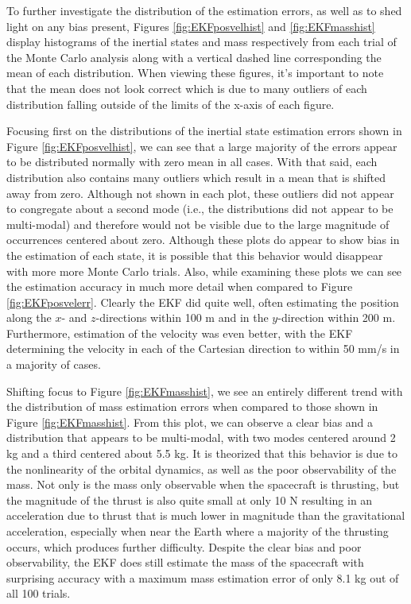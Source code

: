 \documentclass[letterpaper, paper,11pt]{AAS}		%
\begin{document}
To further investigate the distribution of the estimation errors, as well as to shed light on any bias present, Figures \ref{fig:EKFposvelhist} and \ref{fig:EKFmasshist} display histograms of the inertial states and mass respectively from each trial of the Monte Carlo analysis along with a vertical dashed line corresponding the mean of each distribution. When viewing these figures, it's important to note that the mean does not look correct which is due to many outliers of each distribution falling outside of the limits of the x-axis of each figure.

Focusing first on the distributions of the inertial state estimation errors shown in Figure \ref{fig:EKFposvelhist}, we can see that a large majority of the errors appear to be distributed normally with zero mean in all cases. With that said, each distribution also contains many outliers which result in a mean that is shifted away from zero. Although not shown in each plot, these outliers did not appear to congregate about a second mode (i.e., the distributions did not appear to be multi-modal) and therefore would not be visible due to the large magnitude of occurrences centered about zero. Although these plots do appear to show bias in the estimation of each state, it is possible that this behavior would disappear with more more Monte Carlo trials. Also, while examining these plots we can see the estimation accuracy in much more detail when compared to Figure \ref{fig:EKFposvelerr}. Clearly the EKF did quite well, often estimating the position along the $x$- and $z$-directions within 100 m and in the $y$-direction within 200 m. Furthermore, estimation of the velocity was even better, with the EKF determining the velocity in each of the Cartesian direction to within 50 mm/s in a majority of cases. 

Shifting focus to Figure \ref{fig:EKFmasshist}, we see an entirely different trend with the distribution of mass estimation errors when compared to those shown in Figure \ref{fig:EKFmasshist}. From this plot, we can observe a clear bias and a distribution that appears to be multi-modal, with two modes centered around 2 kg and a third centered about 5.5 kg. It is theorized that this behavior is due to the nonlinearity of the orbital dynamics, as well as the poor observability of the mass. Not only is the mass only observable when the spacecraft is thrusting, but the magnitude of the thrust is also quite small at only 10 N resulting in an acceleration due to thrust that is much lower in magnitude than the gravitational acceleration, especially when near the Earth where a majority of the thrusting occurs, which produces further difficulty.  Despite the clear bias and poor observability, the EKF does still estimate the mass of the spacecraft with surprising accuracy with a maximum mass estimation error of only 8.1 kg out of all 100 trials. 
\end{document}
